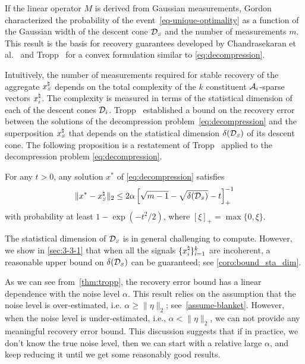 If the linear operator $M$ is derived from Gaussian measurements, Gordon~\cite{gordon1988milman} characterized the probability of the event~\eqref{eq-unique-optimality} as a function of the Gaussian width of the descent cone $\mathcal{D}_{\scriptscriptstyle S}$ and the number of measurements $m$. This result is the basis for recovery guarantees developed by Chandrasekaran et al.~\cite{chandrasekaran2012convex} and Tropp~\cite{tropp2015convex} for a convex formulation similar to \eqref{eq:decompression}.

Intuitively, the number of measurements required for stable recovery of the aggregate $x_{\scriptscriptstyle S}^\natural$ depends on the total complexity of the $k$ constituent $\mathcal{A}_i$-sparse vectors $x_i^{\natural}$. The complexity is measured in terms of the statistical dimension of each of the descent cones $\mathcal{D}_i$.
Tropp~\cite[Corollary~3.5]{tropp2015convex} established a bound on the recovery error between the solutions of the decompression problem~\eqref{eq:decompression} and the superposition $x_{\scriptscriptstyle S}^{\natural}$ that depends on the statistical dimension $\delta(\mathcal{D}_{\scriptscriptstyle S})$ of its descent cone. The following proposition is a restatement of Tropp~\cite[Corollary~3.5]{tropp2015convex} applied to the decompression problem \eqref{eq:decompression}.

\begin{proposition}%
    \label{thm:tropp}
    For any $t>0$, any solution $x^*$ of \eqref{eq:decompression} satisfies
    \begin{equation*}
        \|x^* - x_{\scriptscriptstyle S}^\natural\|_2 \leq 2\alpha\left[\sqrt{m - 1} - \sqrt{\delta(\mathcal{D}_{\scriptscriptstyle S})} - t\right]_+^{-1}
    \end{equation*}
    with probability at least $1 - \exp(-t^2/2)$, where $[\xi]_+=\max\{0,\xi\}$. 
\end{proposition}

The statistical dimension of $\mathcal{D}_{\scriptscriptstyle S}$ is in general challenging to compute. However, we show in \autoref{sec:3-3-1} that when all the signals $\{x_i^{\natural}\}_{i=1}^k$ are incoherent, a reasonable upper bound on $\delta(\mathcal{D}_{\scriptscriptstyle S})$ can be guaranteed; see \autoref{coro:bound_sta_dim}.

As we can see from~\autoref{thm:tropp}, the recovery error bound has a linear dependence with the noise level $\alpha$. This result relies on the assumption that the noise level is over-estimated, i.e. $\alpha \geq \|\eta\|_2$; see~\autoref{assume-blanket}. However, when the noise level is under-estimated, i.e., $\alpha < \|\eta\|_2$, we can not provide any meaningful recovery error bound. This discussion suggests that if in practice, we don't know the true noise level, then we can start with a relative large $\alpha$, and keep reducing it until we get some reasonably good results.

